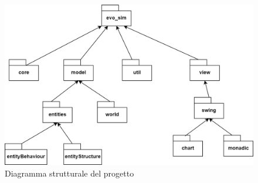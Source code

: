 \begin{figure}[h!]
\centering
\includegraphics[width=\textwidth, scale=0.44]{img/Packages.png}
\caption{Diagramma strutturale del progetto}
\label{fig:pakage}
\end{figure}
